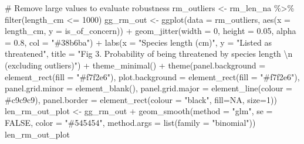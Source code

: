 \documentclass[
  letterpaper,
  DIV=11,
  numbers=noendperiod]{scrartcl}
\newenvironment{Shaded}{\begin{snugshade}}{\end{snugshade}}
\newcommand{\AttributeTok}[1]{\textcolor[rgb]{0.40,0.45,0.13}{#1}}
\newcommand{\CommentTok}[1]{\textcolor[rgb]{0.37,0.37,0.37}{#1}}
\newcommand{\ConstantTok}[1]{\textcolor[rgb]{0.56,0.35,0.01}{#1}}
\newcommand{\DecValTok}[1]{\textcolor[rgb]{0.68,0.00,0.00}{#1}}
\newcommand{\FloatTok}[1]{\textcolor[rgb]{0.68,0.00,0.00}{#1}}
\newcommand{\FunctionTok}[1]{\textcolor[rgb]{0.28,0.35,0.67}{#1}}
\newcommand{\NormalTok}[1]{\textcolor[rgb]{0.00,0.23,0.31}{#1}}
\newcommand{\OtherTok}[1]{\textcolor[rgb]{0.00,0.23,0.31}{#1}}
\newcommand{\SpecialCharTok}[1]{\textcolor[rgb]{0.37,0.37,0.37}{#1}}
\newcommand{\StringTok}[1]{\textcolor[rgb]{0.13,0.47,0.30}{#1}}
\begin{document}
\begin{Shaded}
\begin{Highlighting}[]
\CommentTok{\# Remove large values to evaluate robustness}
\NormalTok{rm\_outliers }\OtherTok{\textless{}{-}}\NormalTok{ rm\_len\_na }\SpecialCharTok{\%\textgreater{}\%} 
  \FunctionTok{filter}\NormalTok{(length\_cm }\SpecialCharTok{\textless{}=} \DecValTok{1000}\NormalTok{)}
\NormalTok{gg\_rm\_out }\OtherTok{\textless{}{-}} \FunctionTok{ggplot}\NormalTok{(}\AttributeTok{data =}\NormalTok{ rm\_outliers, }\FunctionTok{aes}\NormalTok{(}\AttributeTok{x =}\NormalTok{ length\_cm, }
                                            \AttributeTok{y =}\NormalTok{ is\_of\_concern)) }\SpecialCharTok{+}
  \FunctionTok{geom\_jitter}\NormalTok{(}\AttributeTok{width =} \DecValTok{0}\NormalTok{, }\AttributeTok{height =} \FloatTok{0.05}\NormalTok{, }
              \AttributeTok{alpha =} \FloatTok{0.8}\NormalTok{, }\AttributeTok{col =} \StringTok{"\#38b6ba"}\NormalTok{) }\SpecialCharTok{+}
  \FunctionTok{labs}\NormalTok{(}\AttributeTok{x =} \StringTok{"Species length (cm)"}\NormalTok{, }\AttributeTok{y =} \StringTok{"Listed as threatened"}\NormalTok{, }\AttributeTok{title =} \StringTok{"Fig 3. Probability of being threatened by species length }\SpecialCharTok{\textbackslash{}n}\StringTok{ (excluding outliers)"}\NormalTok{) }\SpecialCharTok{+}
  \FunctionTok{theme\_minimal}\NormalTok{() }\SpecialCharTok{+}
  \FunctionTok{theme}\NormalTok{(}\AttributeTok{panel.background =} \FunctionTok{element\_rect}\NormalTok{(}\AttributeTok{fill =} \StringTok{"\#f7f2e6"}\NormalTok{),}
        \AttributeTok{plot.background =} \FunctionTok{element\_rect}\NormalTok{(}\AttributeTok{fill =} \StringTok{"\#f7f2e6"}\NormalTok{),}
        \AttributeTok{panel.grid.minor =} \FunctionTok{element\_blank}\NormalTok{(),}
        \AttributeTok{panel.grid.major =} \FunctionTok{element\_line}\NormalTok{(}\AttributeTok{colour =} \StringTok{\textquotesingle{}\#c9c9c9\textquotesingle{}}\NormalTok{),}
        \AttributeTok{panel.border =} \FunctionTok{element\_rect}\NormalTok{(}\AttributeTok{colour =} \StringTok{"black"}\NormalTok{, }\AttributeTok{fill=}\ConstantTok{NA}\NormalTok{, }\AttributeTok{size=}\DecValTok{1}\NormalTok{))}
\NormalTok{len\_rm\_out\_plot }\OtherTok{\textless{}{-}}\NormalTok{ gg\_rm\_out }\SpecialCharTok{+}
  \FunctionTok{geom\_smooth}\NormalTok{(}\AttributeTok{method =} \StringTok{"glm"}\NormalTok{, }
              \AttributeTok{se =} \ConstantTok{FALSE}\NormalTok{, }\AttributeTok{color =} \StringTok{"\#545454"}\NormalTok{, }
              \AttributeTok{method.args =} \FunctionTok{list}\NormalTok{(}\AttributeTok{family =} \StringTok{"binomial"}\NormalTok{))}
\NormalTok{len\_rm\_out\_plot}
\end{Highlighting}
\end{Shaded}
\end{document}
